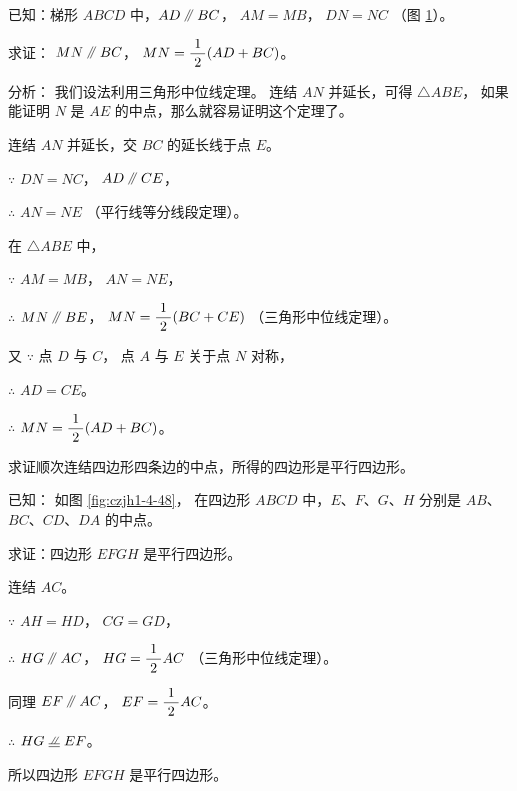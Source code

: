 \begin{enhancedline}
已知：梯形 $ABCD$ 中，$AD \pingxing BC$， $AM = MB$， $DN = NC$ （图 \ref{fig:czjh1-4-47}）。

\begin{figure}
    \centering
    
    \caption{}\label{fig:czjh1-4-47}
\end{figure}

求证： $MN \pingxing BC$， $MN = \dfrac{\; 1 \;}{2} (AD + BC)$。

分析： 我们设法利用三角形中位线定理。 连结 $AN$ 并延长，可得 $\triangle ABE$，
如果能证明 $N$ 是 $AE$ 的中点，那么就容易证明这个定理了。

\zhengming 连结 $AN$ 并延长，交 $BC$ 的延长线于点 $E$。

$\because$ \quad $DN = NC$， $AD \pingxing CE$，

$\therefore$ \quad $AN = NE$ （平行线等分线段定理）。

在 $\triangle ABE$ 中，

$\because$ \quad $AM = MB$， $AN = NE$，

$\therefore$ \quad $MN \pingxing BE$， $MN = \dfrac{\; 1 \;}{2} (BC + CE)$ （三角形中位线定理）。

又 $\because$ \quad 点 $D$ 与 $C$， 点 $A$ 与 $E$ 关于点 $N$ 对称，

$\therefore$ \quad $AD = CE$。

$\therefore$ \quad $MN = \dfrac{\; 1 \;}{2} (AD + BC)$。



\liti[0] 求证顺次连结四边形四条边的中点，所得的四边形是平行四边形。

已知： 如图 \ref{fig:czjh1-4-48}， 在四边形 $ABCD$ 中，$E$、$F$、$G$、$H$ 分别是 $AB$、$BC$、$CD$、$DA$ 的中点。

求证：四边形 $EFGH$ 是平行四边形。

\zhengming 连结 $AC$。

$\because$ \quad $AH = HD$， $CG = GD$，

$\therefore$ \quad $HG \pingxing AC$， $HG = \dfrac{\; 1 \;}{2} AC$ （三角形中位线定理）。

同理 $EF \pingxing AC$， $EF = \dfrac{\; 1 \;}{2} AC$。

$\therefore$ \quad $HG \pxqdy EF$。

所以四边形 $EFGH$ 是平行四边形。


\end{enhancedline}
